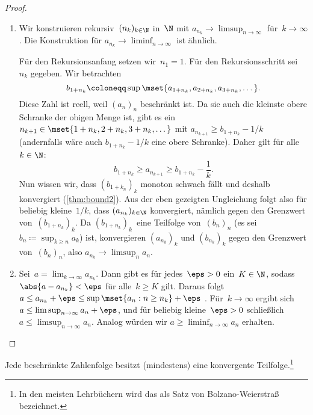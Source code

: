 \documentclass[a4paper]{article}
\begin{document}
\begin{proof}\leavevmode
    \begin{enumerate}
        \item Wir konstruieren rekursiv~$(n_k)_{k\in\N}$ in~$\N$ mit $a_{n_k} \to \limsup_{n\to\infty}$ für~$k \to \infty$. Die Konstruktion für $a_{n_k} \to \liminf_{n\to\infty}$ ist ähnlich.

              Für den Rekursionsanfang setzen wir~$n_1 = 1$. Für den Rekursionsschritt sei~$n_k$ gegeben. Wir betrachten
              \begin{equation*}
                  b_{1+n_k} \coloneqq \sup\mset{a_{1+n_k}, a_{2+n_k}, a_{3+n_k}, \dots}.
              \end{equation*}
              Diese Zahl ist reell, weil $(a_n)_n$ beschränkt ist. Da sie auch die kleinste obere Schranke der obigen Menge ist, gibt es ein~$n_{k+1} \in \mset{1+n_k, 2+n_k, 3+n_k, \dots}$ mit $a_{n_{k+1}} \geq b_{1+n_k} - 1/k$ (andernfalls wäre auch $b_{1+n_k} - 1/k$ eine obere Schranke). Daher gilt für alle~$k \in \N$:
              \begin{equation*}
                  b_{1+n_k} \geq a_{n_{k+1}} \geq b_{1+n_k} - \frac{1}{k}.
              \end{equation*}
              Nun wissen wir, dass $(b_{1+k_n})_k$ monoton schwach fällt und deshalb konvergiert (\cref{thm:bound2}). Aus der eben gezeigten Ungleichung folgt also für beliebig kleine~$1/k$, dass $(a_{n_k})_{k\in\N}$ konvergiert, nämlich gegen den Grenzwert von~$(b_{1+n_k})_k$. Da $(b_{1+n_k})_k$~eine Teilfolge von~$(b_n)_n$ (es sei $b_n \coloneqq \sup_{k\geq n} a_k$) ist, konvergieren $(a_{n_k})_k$ und $(b_{n_k})_k$ gegen den Grenzwert von~$(b_n)_n$, also $a_{n_k} \to \limsup_n a_n$.

        \item Sei~$a = \lim_{k\to\infty} a_{n_k}$. Dann gibt es für jedes~$\eps > 0$ ein~$K \in \N$, sodass $\abs{a-a_{n_k}} < \eps$ für alle~$k \geq K$ gilt. Daraus folgt $a \leq a_{n_k} + \eps \leq \sup\mset{a_n : n \geq n_k} + \eps$ . Für~$k \to \infty$ ergibt sich $a \leq \limsup_{n\to\infty} a_n + \eps$, und für beliebig kleine~$\eps > 0$ schließlich $a \leq \limsup_{n\to\infty} a_n$. Analog würden wir $a \geq \liminf_{n\to\infty} a_n$ erhalten.\qedhere
    \end{enumerate}
\end{proof}

\begin{corollary}
    Jede beschränkte Zahlenfolge besitzt (mindestens) eine konvergente Teilfolge.\footnote{In den meisten Lehrbüchern wird das als Satz von Bolzano-Weierstraß bezeichnet.}
\end{corollary}
\end{document}
